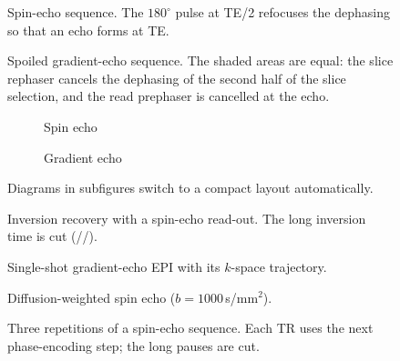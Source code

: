 \documentclass{article}
\begin{document}
\begin{figure}[htbp]
  \centering
  \SpinEchoDiagram[TE=10]
  \caption{Spin-echo sequence. The $180^\circ$ pulse at TE/2 refocuses the
    dephasing so that an echo forms at TE.}
\end{figure}

\begin{figure}[htbp]
  \centering
  \GradientEchoDiagram[flip label=$\alpha$, spoiler, equal areas]
  \caption{Spoiled gradient-echo sequence. The shaded areas are equal: the
    slice rephaser cancels the dephasing of the second half of the slice
    selection, and the read prephaser is cancelled at the echo.}
\end{figure}

\begin{figure}[htbp]
  \begin{subfigure}{0.48\linewidth}
    \SpinEchoDiagram[rows={rf,gz,gy,gx,sig}]
    \caption{Spin echo}
  \end{subfigure}\hfill
  \begin{subfigure}{0.48\linewidth}
    \GradientEchoDiagram[rows={rf,gz,gy,gx,sig}]
    \caption{Gradient echo}
  \end{subfigure}
  \caption{Diagrams in subfigures switch to a compact layout automatically.}
\end{figure}

\begin{figure}[htbp]
  \centering
  \InversionRecoveryDiagram[rows={rf,gz,gy,gx,sig,mz}, TI=300, T1=600]
  \caption{Inversion recovery with a spin-echo read-out. The long inversion
    time is cut (//).}
\end{figure}

\begin{figure}[htbp]
  \centering
  \EPIDiagram[kspace, rows={rf,gz,gy,gx,adc}]
  \caption{Single-shot gradient-echo EPI with its $k$-space trajectory.}
\end{figure}

\begin{figure}[htbp]
  \centering
  \DiffusionSpinEchoDiagram
  \caption{Diffusion-weighted spin echo ($b = 1000$\,s/mm$^2$).}
\end{figure}

\begin{figure}[htbp]
  \centering
  \SpinEchoDiagram[repetitions=3, TR=600, rows={rf,gz,gy,gx,sig,mz}]
  \caption{Three repetitions of a spin-echo sequence. Each TR uses the next
    phase-encoding step; the long pauses are cut.}
\end{figure}
\end{document}
